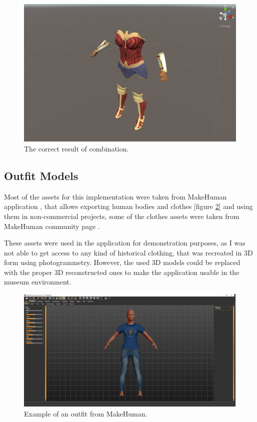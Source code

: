 \documentclass[a4paper]{report}
\begin{document}
\begin{figure}[H]
    \centering
    \includegraphics[width=\textwidth , keepaspectratio]{images/ClothesDemos/Screenshot 2021-05-08 221401.png}
      
    \caption{The correct result of combination.}
    \label{fig:stenc_3}
\end{figure}


\subsection{Outfit Models}
\label{section_models}
\qquad Most of the assets for this implementation were taken from MakeHuman application \cite{makehuman}, that allows exporting human bodies and clothes [figure \ref{fig:makehuman_outfit}] and using them in non-commercial projects, some of the clothes assets were taken from MakeHuman community page \cite{makehumanCommunity}. 

These assets were used in the application for demonstration purposes, as I was not able to get access to any kind of historical clothing, that was recreated in 3D form using photogrammetry. However, the used 3D models could be replaced with the proper 3D reconstructed ones to make the application usable in the museum environment.



\begin{figure}[H]
\centering
  \includegraphics[width=\textwidth, keepaspectratio]{images/Models/model_makehuman.png}
  \caption{Example of an outfit from MakeHuman.}
  \label{fig:makehuman_outfit}
\end{figure}
\end{document}
